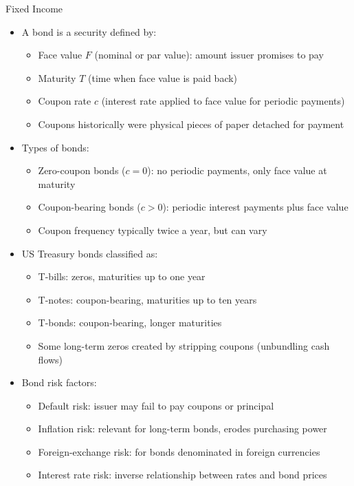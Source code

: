 \documentclass[10pt,handout]{beamer}
\begin{document}
\begin{frame}{Fixed Income}
  \begin{itemize}[<+->]
    \item A bond is a security defined by:
      \begin{itemize}
        \item Face value $F$ (nominal or par value): amount issuer promises to pay
        \item Maturity $T$ (time when face value is paid back)
        \item Coupon rate $c$ (interest rate applied to face value for periodic payments)
        \item Coupons historically were physical pieces of paper detached for payment
      \end{itemize}
    \item Types of bonds:
      \begin{itemize}
        \item Zero-coupon bonds ($c = 0$): no periodic payments, only face value at maturity
        \item Coupon-bearing bonds ($c > 0$): periodic interest payments plus face value
        \item Coupon frequency typically twice a year, but can vary
      \end{itemize}
    \item US Treasury bonds classified as:
      \begin{itemize}
        \item T-bills: zeros, maturities up to one year
        \item T-notes: coupon-bearing, maturities up to ten years
        \item T-bonds: coupon-bearing, longer maturities
        \item Some long-term zeros created by stripping coupons (unbundling cash flows)
      \end{itemize}
    \item Bond risk factors:
      \begin{itemize}
        \item Default risk: issuer may fail to pay coupons or principal
        \item Inflation risk: relevant for long-term bonds, erodes purchasing power
        \item Foreign-exchange risk: for bonds denominated in foreign currencies
        \item Interest rate risk: inverse relationship between rates and bond prices
      \end{itemize}
  \end{itemize}
\end{frame}
\end{document}
